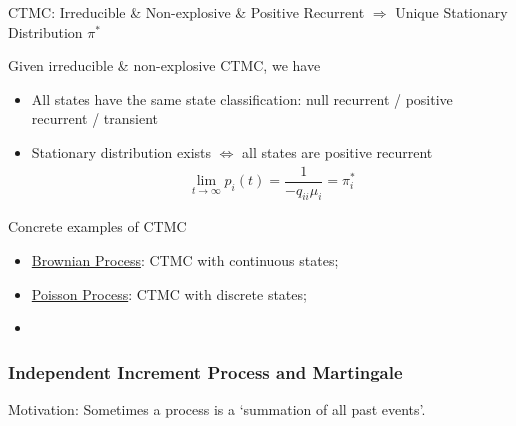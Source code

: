 \begin{point}
    CTMC: Irreducible \& Non-explosive \& Positive Recurrent $ \Rightarrow  $ Unique Stationary Distribution $ \pi^* $
\end{point}

Given irreducible \& non-explosive CTMC, we have
\begin{itemize}[topsep=2pt,itemsep=0pt]
    \item All states have the same state classification: null recurrent / positive recurrent / transient
    \item Stationary distribution exists $ \Leftrightarrow $ all states are positive recurrent
    \begin{align}
        \lim_{t\to\infty}p_i(t)=\dfrac{1}{-q_{ii}\mu _i} = \pi^*_i
    \end{align}
\end{itemize}


\begin{point}
    Concrete examples of CTMC
\end{point}
\begin{itemize}[topsep=2pt,itemsep=0pt]
    \item \hyperlink{BrownianProcess}{Brownian Process}: CTMC with continuous states;
    \item \hyperlink{PoissonProcess}{Poisson Process}: CTMC with discrete states;
    \item 
\end{itemize}


\subsubsection{Independent Increment Process and Martingale}\label{SubSubSectionIndepedentProcess}

Motivation: Sometimes a process is a `summation of all past events'.

